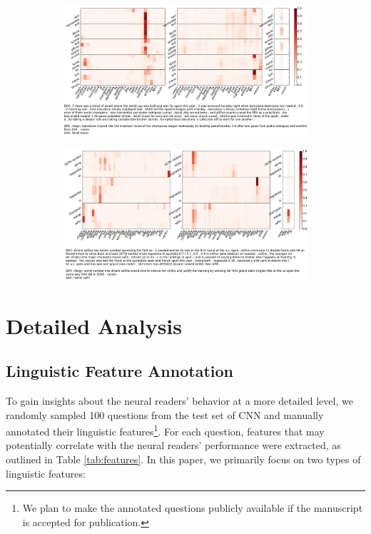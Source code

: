 \documentclass[11pt,a4paper]{article}
\begin{document}
\begin{figure}
\centering
\caption{\small Layer-wise attention visualization of GA Reader trained on WDW-Strict. See text for details.}
\begin{subfigure}[b]{\textwidth}
\centering
\includegraphics[width=\linewidth]{attention_plots/APW_ENG_20101124_0890_question.png}
\end{subfigure}
\begin{subfigure}[b]{\textwidth}
\centering
\includegraphics[width=\linewidth]{attention_plots/AFP_ENG_20090829_0124_question.png}
\end{subfigure}
\end{figure}

\iffalse
\section{Detailed Analysis}
\label{sec:error}
\subsection{Linguistic Feature Annotation}
To gain insights about the neural readers' behavior at a more detailed level, we randomly sampled 100 questions from the test set of CNN and manually annotated their linguistic features\footnote{We plan to make the annotated questions publicly available if the manuscript is accepted for publication.}. For each question, features that may potentially correlate with the neural readers' performance were extracted, as outlined in Table \ref{tab:features}. In this paper, we primarily focus on two types of linguistic features:
\end{document}
